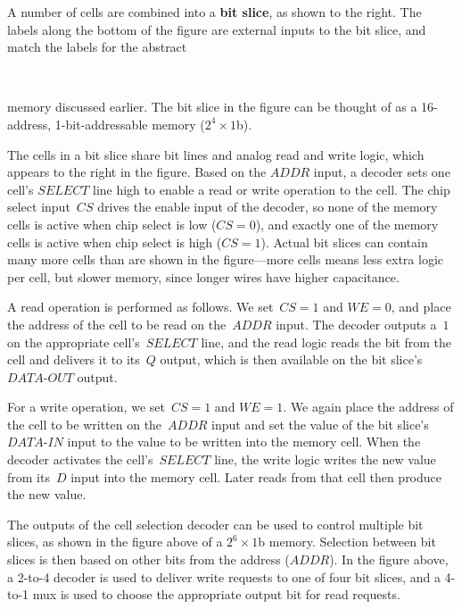 \begin{minipage}{1.25in}
A number of cells are combined into a {\bf bit slice}, as shown to
the right.
%
The labels along the bottom of the figure are external inputs to the 
bit slice, and match the labels for the abstract\linebreak
\end{minipage}\hspace{0.25in}%
\begin{minipage}{5in}
\\
\end{minipage}\mpdone

memory discussed earlier.  The 
bit slice in the figure can be thought of as a \mbox{16-address},
\mbox{1-bit-addressable} memory ($2^4\times{1}$b).

The cells in a bit slice
share bit lines and analog read and write logic, which appears to the
right in the figure.  Based on the $ADDR$ input, a decoder sets one
cell's $SELECT$ line high to enable a read or write operation to the
cell.  
%
The chip select input~$CS$ drives the enable input of
the decoder, so none of the memory cells is active when chip select is
low ($CS=0$), and exactly one of the memory cells is active when
chip select is high ($CS=1$).
%
Actual bit slices can contain many more cells than are shown in the 
figure---more cells means less extra logic per cell, but slower memory,
since longer wires have higher capacitance.

A read operation is performed as follows.  We set~$CS=1$ and $WE=0$,
and place the address of the cell to be read on the~$ADDR$ input.
The decoder outputs a~$1$ on the appropriate cell's~$SELECT$ line,
and the read logic reads the bit from the cell and delivers it
to its~$Q$ output, which is then available on the bit 
slice's~\mbox{$DATA$-$OUT$} output.

For a write operation, we set~$CS=1$ and $WE=1$.  We again place the
address of the cell to be written on the~$ADDR$ input and set the
value of the bit slice's~\mbox{$DATA$-$IN$} input to the value to be written
into the memory cell.  When the decoder activates the cell's~$SELECT$ line,
the write logic writes the new value from its~$D$ input into
the memory cell.  Later reads from that cell then produce the new value.\\

\centerline{}

The outputs of the cell selection decoder can be used to control
multiple bit slices, as shown in the figure above of a \mbox{$2^6\times{1}$b}
memory.  Selection between bit slices is
then based on other bits from the address ($ADDR$).  In the figure
above, a \mbox{2-to-4} decoder is used to deliver write requests to
one of four bit slices, and a \mbox{4-to-1} mux is used to choose
the appropriate output bit for read requests.

